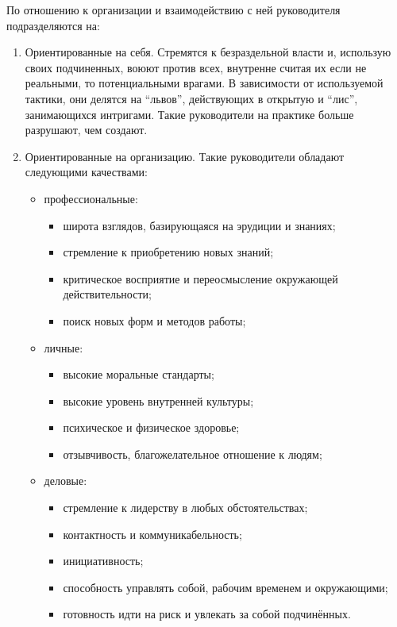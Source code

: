 \documentclass[12pt, russian, oneside, article]{ncc}
\begin{document}
По отношению к организации и взаимодействию с ней руководителя подразделяются на:
\begin{enumerate}
\item Ориентированные на себя. Стремятся к безраздельной власти и, использую своих подчиненных, воюют против всех, внутренне считая их если не реальными, то потенциальными врагами. В зависимости от используемой тактики, они делятся на ``львов'', действующих в открытую и ``лис'', занимающихся интригами. Такие руководители на практике больше разрушают, чем создают.
\item Ориентированные на организацию. Такие руководители обладают следующими качествами:

\begin{itemize}
\item профессиональные:

\begin{itemize}
\item широта взглядов, базирующаяся на эрудиции и знаниях;
\item стремление к приобретению новых знаний;
\item критическое восприятие и переосмысление окружающей действительности;
\item поиск новых форм и методов работы;
\end{itemize}

\item личные:

\begin{itemize}
\item высокие моральные стандарты;
\item высокие уровень внутренней культуры;
\item психическое и физическое здоровье;
\item отзывчивость, благожелательное отношение к людям;
\end{itemize}

\item деловые:

\begin{itemize}
\item стремление к лидерству в любых обстоятельствах;
\item контактность и коммуникабельность;
\item инициативность;
\item способность управлять собой, рабочим временем и окружающими;
\item готовность идти на риск и увлекать за собой подчинённых.
\end{itemize}

\end{itemize}

\end{enumerate}
\end{document}
